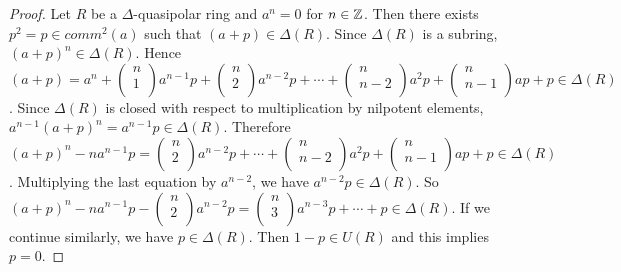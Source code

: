 \documentclass[12pt, reqno]{amsart}
\numberwithin{equation}{section}
\begin{document}
\begin{proof}
    Let $R$ be a $\Delta$-quasipolar ring and $a^n=0$ for $n\in \Bbb{Z}$. Then there exists $p^2=p\in comm^2(a)$ such that $(a+p)\in \Delta(R)$. Since $\Delta(R)$ is a subring, $(a+p)^n\in \Delta(R)$. Hence $(a+p)=a^n+\left(%
\begin{array}{c}
  n \\
  1 \\
\end{array}%
\right)a^{n-1}p+\left(%
\begin{array}{c}
  n \\
  2 \\
\end{array}%
\right)a^{n-2}p+\cdots +\left(%
\begin{array}{c}
  n \\
  n-2 \\
\end{array}%
\right)a^2p+\left(%
\begin{array}{c}
  n \\
  n-1 \\
\end{array}%
\right)ap+p\in \Delta(R)$. Since $\Delta(R)$ is closed with respect to multiplication by nilpotent elements, $a^{n-1}(a+p)^n=a^{n-1}p\in \Delta(R)$. Therefore $(a+p)^{n}-na^{n-1}p=\left(%
\begin{array}{c}
  n \\
  2 \\
\end{array}%
\right)a^{n-2}p+\cdots +\left(%
\begin{array}{c}
  n \\
  n-2 \\
\end{array}%
\right)a^2p+\left(%
\begin{array}{c}
  n \\
  n-1 \\
\end{array}%
\right)ap+p\in \Delta(R)$. Multiplying the last equation by $a^{n-2}$, we have $a^{n-2}p\in \Delta(R)$. So $(a+p)^{n}-na^{n-1}p-\left(%
\begin{array}{c}
  n \\
  2 \\
\end{array}%
\right)a^{n-2}p=\left(%
\begin{array}{c}
  n \\
  3 \\
\end{array}%
\right)a^{n-3}p+\cdots +p\in \Delta(R)$. If we continue similarly, we have $p\in \Delta(R)$. Then $1-p\in U(R)$ and this implies $p=0$.
\end{proof}
\end{document}
